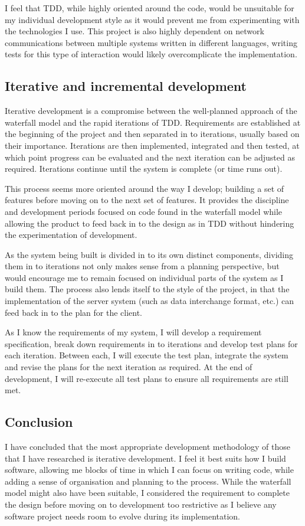 \documentclass[a4papert,11pt,notitlepage]{ltxdoc}
\begin{document}
I feel that TDD, while highly oriented around the code, would be unsuitable for my individual development style as it would prevent me from experimenting with the technologies I use. This project is also highly dependent on network communications between multiple systems written in different languages, writing tests for this type of interaction would likely overcomplicate the implementation.

\subsection{Iterative and incremental development}
Iterative development is a compromise between the well-planned approach of the waterfall model and the rapid iterations of TDD. Requirements are established at the beginning of the project and then separated in to iterations, usually based on their importance. Iterations are then implemented, integrated and then tested, at which point progress can be evaluated and the next iteration can be adjusted as required. Iterations continue until the system is complete (or time runs out).

This process seems more oriented around the way I develop; building a set of features before moving on to the next set of features. It provides the discipline and development periods focused on code found in the waterfall model while allowing the product to feed back in to the design as in TDD without hindering the experimentation of development.

As the system being built is divided in to its own distinct components, dividing them in to iterations not only makes sense from a planning perspective, but would encourage me to remain focused on individual parts of the system as I build them. The process also lends itself to the style of the project, in that the implementation of the server system (such as data interchange format, etc.) can feed back in to the plan for the client.

As I know the requirements of my system, I will develop a requirement specification, break down requirements in to iterations and develop test plans for each iteration. Between each, I will execute the test plan, integrate the system and revise the plans for the next iteration as required. At the end of development, I will re-execute all test plans to ensure all requirements are still met.

\subsection{Conclusion}
I have concluded that the most appropriate development methodology of those that I have researched is iterative development. I feel it best suits how I build software, allowing me blocks of time in which I can focus on writing code, while adding a sense of organisation and planning to the process. While the waterfall model might also have been suitable, I considered the requirement to complete the design before moving on to development too restrictive as I believe any software project needs room to evolve during its implementation.
\end{document}
